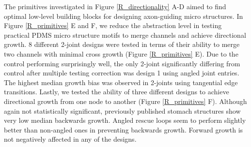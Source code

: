 The primitives investigated in Figure \ref{R_directionality} A-D aimed to find
optimal low-level building blocks for designing axon-guiding micro structures.
In Figure \ref{R_primitives} E and F, we reduce the abstraction level in testing
practical PDMS micro structure motifs to merge channels and achieve directional
growth. 8 different 2-joint designs were tested in terms of their ability to
merge two channels with minimal cross growth (Figure \ref{R_primitives} E). Due
to the control performing surprisingly well, the only 2-joint significantly
differing from control after multiple testing correction was design 1 using
angled joint entries. The highest median growth bias was observed in 2-joints
using tangential edge transitions. Lastly, we tested the ability of three
different designs to achieve directional growth from one node to another (Figure
\ref{R_primitives} F). Although again not statistically significant, previously
published stomach structures show very low median backwards growth. Angled
rescue loops seem to perform slightly better than non-angled ones in preventing
backwards growth. Forward growth is not negatively affected in any of the
designs.

